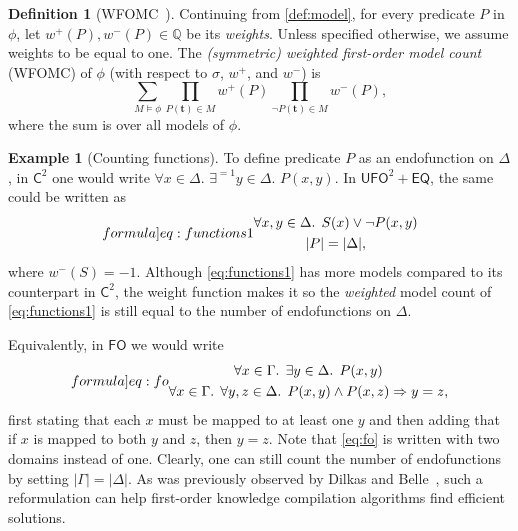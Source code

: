 \documentclass{article}
\theoremstyle{definition}
\newtheorem{definition}{Definition}
\newtheorem{example}{Example}
\theoremstyle{remark}
\newcommand{\Ctwo}{$\mathsf{C}^{2}$}
\newcommand{\FO}{$\mathsf{FO}$}
\newcommand{\UFO}{$\mathsf{UFO}^{2} + \mathsf{EQ}$}
\begin{document}
\begin{definition}[WFOMC~\cite{DBLP:conf/ijcai/BroeckTMDR11}]
  Continuing from \cref{def:model}, for every predicate $P$ in $\phi$, let
  $w^{+}(P), w^{-}(P) \in \mathbb{Q}$ be its \emph{weights}. Unless specified
  otherwise, we assume weights to be equal to one. The \emph{(symmetric)
    weighted first-order model count} (WFOMC) of $\phi$ (with respect to
  $\sigma$, $w^{+}$, and $w^{-}$) is
  \[
    \sum_{M \models \phi} \prod_{P(\mathbf{t}) \in M} w^{+}(P) \prod_{\neg P(\mathbf{t}) \in M} w^{-}(P),
  \]
  where the sum is over all models of $\phi$.
\end{definition}

\begin{example}[Counting functions]\label{example:functions}
  To define predicate $P$ as an endofunction on $\Delta$, in \Ctwo{} one would
  write $\forall x \in \Delta\text{. }\exists^{=1} y \in \Delta\text{.
  }P(x, y)$. In \UFO{}, the same could be written as
  \begin{equation}\label[formula]{eq:functions1}
    \begin{gathered}
      \forall x, y \in \Delta\text{. }S(x) \lor \neg P(x, y)\\
      |P| = |\Delta|,
    \end{gathered}
  \end{equation}
  where $w^{-}(S) = -1$. Although \cref{eq:functions1} has more models compared
  to its counterpart in \Ctwo{}, the weight function makes it so the
  \emph{weighted} model count of \cref{eq:functions1} is still equal to the
  number of endofunctions on $\Delta$.

  Equivalently, in \FO{} we would write
  \begin{equation}\label[formula]{eq:fo}
    \begin{gathered}
      \forall x \in \Gamma\text{. }\exists y \in \Delta\text{. }P(x, y)\\
      \forall x \in \Gamma\text{. }\forall y, z \in \Delta\text{. }P(x, y) \land P(x, z) \Rightarrow y = z,
    \end{gathered}
  \end{equation}
  first stating that each $x$ must be mapped to at least one $y$ and then adding
  that if $x$ is mapped to both $y$ and $z$, then $y=z$. Note that \cref{eq:fo}
  is written with two domains instead of one. Clearly, one can still count the
  number of endofunctions by setting $|\Gamma| = |\Delta|$. As was previously
  observed by Dilkas and Belle~, such a
  reformulation can help first-order knowledge compilation algorithms find
  efficient solutions.
\end{example}
\end{document}
